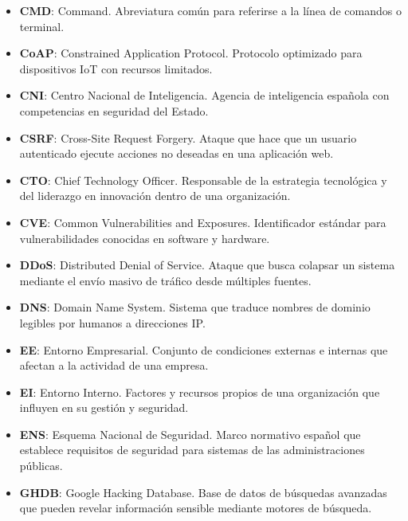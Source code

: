 \documentclass[a4paper, 11pt]{article}
\begin{document}
\begin{itemize}
    \item \textbf{CMD}: Command. Abreviatura común para referirse a la línea de comandos o terminal.

    \item \textbf{CoAP}: Constrained Application Protocol. Protocolo optimizado para dispositivos IoT con recursos limitados.

    \item \textbf{CNI}: Centro Nacional de Inteligencia. Agencia de inteligencia española con competencias en seguridad del Estado.

    \item \textbf{CSRF}: Cross-Site Request Forgery. Ataque que hace que un usuario autenticado ejecute acciones no deseadas en una aplicación web.

    \item \textbf{CTO}: Chief Technology Officer. Responsable de la estrategia tecnológica y del liderazgo en innovación dentro de una organización.

    \item \textbf{CVE}: Common Vulnerabilities and Exposures. Identificador estándar para vulnerabilidades conocidas en software y hardware.

    \item \textbf{DDoS}: Distributed Denial of Service. Ataque que busca colapsar un sistema mediante el envío masivo de tráfico desde múltiples fuentes.

    \item \textbf{DNS}: Domain Name System. Sistema que traduce nombres de dominio legibles por humanos a direcciones IP.

    \item \textbf{EE}: Entorno Empresarial. Conjunto de condiciones externas e internas que afectan a la actividad de una empresa.

    \item \textbf{EI}: Entorno Interno. Factores y recursos propios de una organización que influyen en su gestión y seguridad.

    \item \textbf{ENS}: Esquema Nacional de Seguridad. Marco normativo español que establece requisitos de seguridad para sistemas de las administraciones públicas.

    \item \textbf{GHDB}: Google Hacking Database. Base de datos de búsquedas avanzadas que pueden revelar información sensible mediante motores de búsqueda.


\end{itemize}
\end{document}
